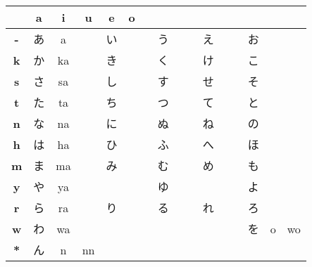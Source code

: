 

\bigskip
\begin{center}
\Huge

\begin{tabular}{c||c|c|c|c|c|}
&\textbf{a}&\textbf{i}&\textbf{u}&\textbf{e}&\textbf{o}\\\hline\hline
\textbf{-}&あ&a&&い&&&う&&&え&&&お&&\\\hline
\textbf{k}&か&ka&&き&&&く&&&け&&&こ&&\\\hline
\textbf{s}&さ&sa&&し&&&す&&&せ&&&そ&&\\\hline
\textbf{t}&た&ta&&ち&&&つ&&&て&&&と&&\\\hline
\textbf{n}&な&na&&に&&&ぬ&&&ね&&&の&&\\\hline
\textbf{h}&は&ha&&ひ&&&ふ&&&へ&&&ほ&&\\\hline
\textbf{m}&ま&ma&&み&&&む&&&め&&&も&&\\\hline
\textbf{y}&や&ya&&  &&&ゆ&&&  &&&よ&&\\\hline
\textbf{r}&ら&ra&&り&&&る&&&れ&&&ろ&&\\\hline
\textbf{w}&わ&wa&&  &&&  &&&  &&&を&o&wo\\\hline
\textbf{{*}}&ん &n&nn& &&& &&& &&& &&\\ \hline
\end{tabular}
\end{center}
